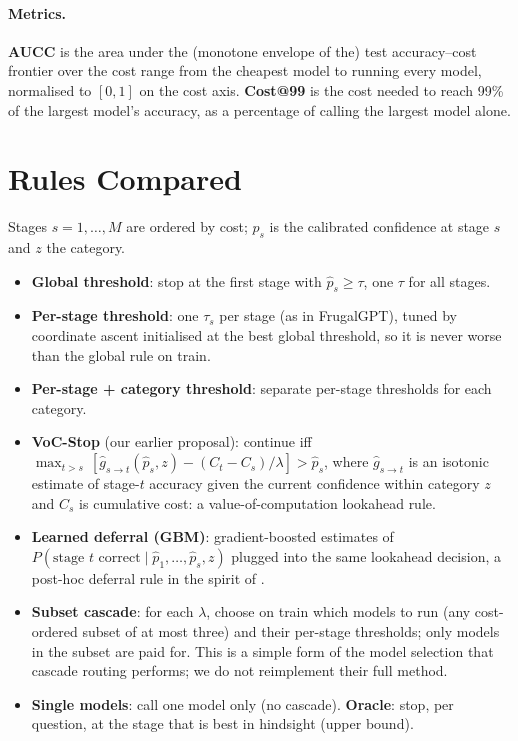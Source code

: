 \documentclass[10pt,twocolumn]{article}
\begin{document}
\paragraph{Metrics.} \textbf{AUCC} is the area under the (monotone envelope of the) test accuracy--cost
frontier over the cost range from the cheapest model to running every model, normalised to $[0,1]$
on the cost axis. \textbf{Cost@99} is the cost needed to reach 99\% of the largest model's accuracy,
as a percentage of calling the largest model alone.

\section{Rules Compared}\label{sec:methods}
Stages $s=1,\dots,M$ are ordered by cost; $\hat p_s$ is the calibrated confidence at stage $s$ and $z$
the category.
\begin{itemize}\itemsep1pt
\item \textbf{Global threshold}: stop at the first stage with $\hat p_s \ge \tau$, one $\tau$ for all stages.
\item \textbf{Per-stage threshold}: one $\tau_s$ per stage (as in FrugalGPT), tuned by coordinate ascent
  initialised at the best global threshold, so it is never worse than the global rule on train.
\item \textbf{Per-stage + category threshold}: separate per-stage thresholds for each category.
\item \textbf{VoC-Stop} (our earlier proposal): continue iff
  $\max_{t>s}\,[\hat g_{s\to t}(\hat p_s, z) - (C_t - C_s)/\lambda] > \hat p_s$, where
  $\hat g_{s\to t}$ is an isotonic estimate of stage-$t$ accuracy given the current confidence within
  category $z$ and $C_s$ is cumulative cost: a value-of-computation lookahead rule.
\item \textbf{Learned deferral (GBM)}: gradient-boosted estimates of $P(\text{stage }t\text{ correct}
  \mid \hat p_1,\dots,\hat p_s, z)$ plugged into the same lookahead decision, a post-hoc deferral rule
  in the spirit of \cite{jitkrittum2023,gupta2024}.
\item \textbf{Subset cascade}: for each $\lambda$, choose on train which models to run (any cost-ordered
  subset of at most three) and their per-stage thresholds; only models in the subset are paid for.
  This is a simple form of the model selection that cascade routing \cite{dekoninck2025} performs;
  we do not reimplement their full method.
\item \textbf{Single models}: call one model only (no cascade). \textbf{Oracle}: stop, per question, at
  the stage that is best in hindsight (upper bound).
\end{itemize}
\end{document}
